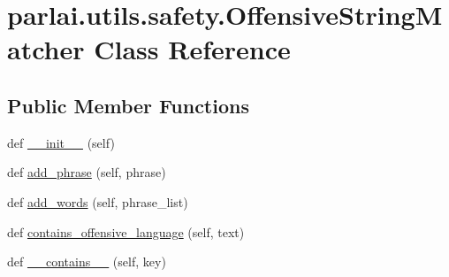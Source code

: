 \hypertarget{classparlai_1_1utils_1_1safety_1_1OffensiveStringMatcher}{}\section{parlai.\+utils.\+safety.\+Offensive\+String\+Matcher Class Reference}
\label{classparlai_1_1utils_1_1safety_1_1OffensiveStringMatcher}
\subsection*{Public Member Functions}
\begin{DoxyCompactItemize}
\item 
def \hyperlink{classparlai_1_1utils_1_1safety_1_1OffensiveStringMatcher_a9e850e121799468d26c5720be21bf72c}{\+\_\+\+\_\+init\+\_\+\+\_\+} (self)
\item 
def \hyperlink{classparlai_1_1utils_1_1safety_1_1OffensiveStringMatcher_a9272830360cad4f382c2350dd39b3e6e}{add\+\_\+phrase} (self, phrase)
\item 
def \hyperlink{classparlai_1_1utils_1_1safety_1_1OffensiveStringMatcher_ab5ca96a02141190f747b03b761f18f98}{add\+\_\+words} (self, phrase\+\_\+list)
\item 
def \hyperlink{classparlai_1_1utils_1_1safety_1_1OffensiveStringMatcher_a926609d00716d64848b3b98079bd1d30}{contains\+\_\+offensive\+\_\+language} (self, text)
\item 
def \hyperlink{classparlai_1_1utils_1_1safety_1_1OffensiveStringMatcher_a89e75aea403630f53f41502fead9708e}{\+\_\+\+\_\+contains\+\_\+\+\_\+} (self, key)
\end{DoxyCompactItemize}
